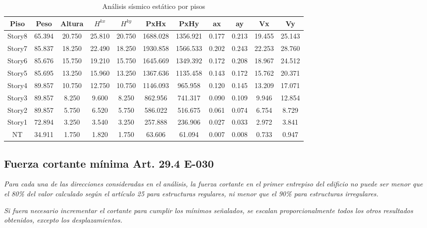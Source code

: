 \documentclass{article}%
\begin{document}
%


\begin{table}[H]%
\centering%
\caption{Análisis sísmico estático por pisos}%
\begin{tabular}{ccccccccccc}
\toprule
Piso & Peso & Altura & $H^{kx}$ & $H^{ky}$ & PxHx & PxHy & ax & ay & Vx & Vy \\
\midrule
Story8 & 65.394 & 20.750 & 25.810 & 20.750 & 1688.028 & 1356.921 & 0.177 & 0.213 & 19.455 & 25.143 \\
Story7 & 85.837 & 18.250 & 22.490 & 18.250 & 1930.858 & 1566.533 & 0.202 & 0.243 & 22.253 & 28.760 \\
Story6 & 85.676 & 15.750 & 19.210 & 15.750 & 1645.669 & 1349.392 & 0.172 & 0.208 & 18.967 & 24.512 \\
Story5 & 85.695 & 13.250 & 15.960 & 13.250 & 1367.636 & 1135.458 & 0.143 & 0.172 & 15.762 & 20.371 \\
Story4 & 89.857 & 10.750 & 12.750 & 10.750 & 1146.093 & 965.958 & 0.120 & 0.145 & 13.209 & 17.071 \\
Story3 & 89.857 & 8.250 & 9.600 & 8.250 & 862.956 & 741.317 & 0.090 & 0.109 & 9.946 & 12.854 \\
Story2 & 89.857 & 5.750 & 6.520 & 5.750 & 586.022 & 516.675 & 0.061 & 0.074 & 6.754 & 8.729 \\
Story1 & 72.894 & 3.250 & 3.540 & 3.250 & 257.888 & 236.906 & 0.027 & 0.033 & 2.972 & 3.841 \\
NT & 34.911 & 1.750 & 1.820 & 1.750 & 63.606 & 61.094 & 0.007 & 0.008 & 0.733 & 0.947 \\
\bottomrule
\end{tabular}
%
\end{table}

%
\subsection{Fuerza cortante mínima Art. 29.4 E{-}030}%
\label{subsec:FuerzacortantemnimaArt.29.4E{-}030}%
\begin{tcolorbox}[colback=gray!5!white,colframe=cyan!75!black,fonttitle=\bfseries,title=Art. 29.4.1]%
\textit{Para cada una de las direcciones consideradas en el análisis, la fuerza cortante en el primer entrepiso del edificio no puede ser menor que el 80\% del valor calculado según el artículo 25 para estructuras regulares, ni menor que el 90\% para estructuras irregulares.}%
\end{tcolorbox}%
\begin{tcolorbox}[colback=gray!5!white,colframe=cyan!75!black,fonttitle=\bfseries,title=Art. 29.4.2]%
\textit{Si fuera necesario incrementar el cortante para cumplir los mínimos señalados,  se escalan proporcionalmente todos los otros resultados obtenidos, excepto los  desplazamientos.}%
\end{tcolorbox}%
\end{document}
